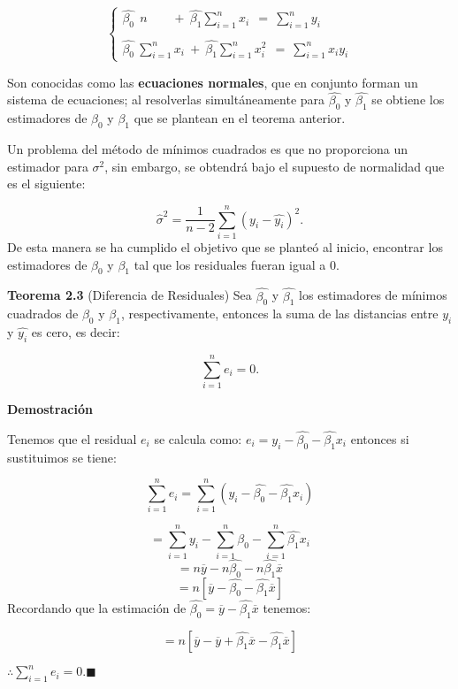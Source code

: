 \documentclass[
  a4paper,
  oneside,
  openany]{book}
\begin{document}
\[
\left\{
\begin{array}{ll} \hat{\beta_{0}} \ \ n  \ \ \  \ \ \ \ \ \ + \ \hat{\beta_{1}}\sum_{i=1}^{n}x_{i}\  \ = \ \sum_{i=1}^{n}y_{i} \\
\\
\hat{\beta_{0}} \ \sum_{i=1}^{n}x_{i} \ + \ \hat{\beta_{1}}\sum_{i=1}^{n}x_{i}^2 \ \ = \ \sum_{i=1}^{n}x_{i}y_{i}
\end{array}
\right. 
\]

Son conocidas como las \textbf{ecuaciones normales}, que en conjunto forman un sistema de ecuaciones; al resolverlas simultáneamente para \(\hat{\beta_{0}}\) y \(\hat{\beta_{1}}\) se obtiene los estimadores de \(\beta_{0}\) y \(\beta_{1}\) que se plantean en el teorema anterior.

Un problema del método de mínimos cuadrados es que no proporciona un estimador para \(\sigma^2\), sin embargo, se obtendrá bajo el supuesto de normalidad que es el siguiente:

\[\hat{\sigma}^2=\frac{1}{n-2}\sum_{i=1}^{n}(y_{i}-\hat{y_{i}})^2.\]
De esta manera se ha cumplido el objetivo que se planteó al inicio, encontrar los estimadores de \(\beta_{0}\) y \(\beta_{1}\) tal que los residuales fueran igual a 0.

\textbf{Teorema 2.3} (Diferencia de Residuales) Sea \(\hat{\beta_{0}}\) y \(\hat{\beta_{1}}\) los estimadores de mínimos cuadrados de \(\beta_{0}\) y \(\beta_{1}\), respectivamente, entonces la suma de las distancias entre \(y_{i}\) y \(\hat{y_{i}}\) es cero, es decir:

\[\sum_{i=1}^{n}e_{i}=0.\]

\textbf{Demostración}

Tenemos que el residual \(e_{i}\) se calcula como: \(e_{i}=y_{i}-\hat{\beta_{0}}-\hat{\beta_1}x_{i}\) entonces si sustituimos se tiene:

\[\sum_{i=1}^{n}e_{i}=\sum_{i=1}^{n}\left(y_{i}-\hat{\beta_{0}}-\hat{\beta_1}x_{i}\right)\]

\[=\sum_{i=1}^{n}y_{i}-\sum_{i=1}^{n}\hat{\beta_{0}}-\sum_{i=1}^{n}\hat{\beta_{1}}x_{i}\]
\[=n\overline{y}-n\hat{\beta_{0}}-n\hat{\beta_{1}}\overline{x}\]
\[=n\left[\overline{y}-\hat{\beta_{0}}-\hat{\beta_{1}}\overline{x}\right]\]
Recordando que la estimación de \(\hat{\beta_{0}}=\overline{y}-\hat{\beta_{1}}\overline{x}\) tenemos:

\[=n\left[\overline{y}-\overline{y}+\hat{\beta_{1}}\overline{x}-\hat{\beta_{1}}\overline{x}\right]\]

\(\therefore \sum_{i=1}^{n}e_{i}=0. \blacksquare\)
\end{document}
